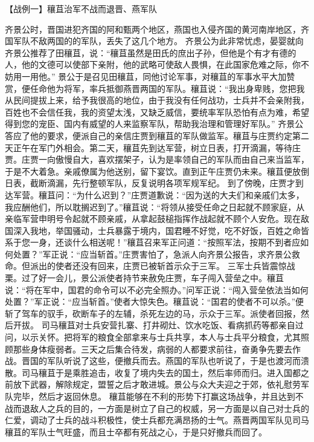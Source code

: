 \documentclass[a4paper,12pt,UTF8,twoside]{ctexbook}
\begin{document}
【战例一】穰苴治军不战而退晋、燕军队

齐景公时，晋国进犯齐国的阿和甄两个地区，燕国也入侵齐国的黄河南岸地区，齐国军队不敌两国的的军队，丢失了这几个地方。
齐景公为此非常忧虑，晏婴就向齐景公推荐了田穰苴，说：“穰苴虽然是田氏的庶出子孙，但他是个有才有德的人，他的文德可以使部下亲附，他的武略可使敌人畏惧，在此国家危难之际，你不妨用一用他。”
景公于是召见田穰苴，同他讨论军事，对穰苴的军事水平大加赞赏，便任命他为将军，率兵抵御燕晋两国的军队。穰苴说：“我出身卑贱，您把我从民间提拔上来，给予我很高的地位，由于我没有任何战功，士兵并不会亲附我，百姓也不会信任我，我的资望太浅，又缺乏威信，要统率军队恐怕有点为难，希望得到您的宠臣、国内有威望的人来监察军队，帮助我治理和管理好军队。”
齐景公答应了他的要求，便派自己的亲信庄贾到穰苴的军队做监军。穰苴与庄贾约定第二天正午在军门外相会。第二天，穰苴先到达军营，树立日表，打开滴漏，等待庄贾。庄贾一向傲慢自大，喜欢摆架子，认为是率领自己的军队而由自己来当监军，于是不大着急。亲戚僚属为他送别，留下宴饮。直到正午庄贾仍未来。穰苴便放倒日表，截断滴漏，先行整顿军队，反复说明各项军规军纪。
到了傍晚，庄贾才到达军营。穰苴问：“为什么迟到？”庄贾道歉说：“因为送的大夫们和亲戚们太多，我应酬他们，所以耽搁迟到了。”穰苴说：“将领从接受任命之日起就不顾家庭，从亲临军营申明号令起就不顾亲戚，从拿起鼓槌指挥作战起就不顾个人安危。现在敌国深入我地，举国骚动，士兵暴露于境内，国君睡不好觉，吃不好饭，百姓之命皆系于您一身，还谈什么相送呢！”穰苴召来军正问道：“按照军法，按期不到者应如何处置？”军正说：“应当斩首。”庄贾害怕了，急派人向齐景公报告，求齐景公救命。但派出的使者还没有回来，庄贾已被斩首示众于三军。
三军士兵皆震惊战栗。过了好一会儿，景公派使者持节来赦免庄贾，车子闯入营垒之中。穰苴说：“将在军中，国君的命令可以不必完全照办。”问军正说：“闯入营垒依法当如何处置？”军正说：“应当斩首。”使者大惊失色。穰苴说：“国君的使者不可以杀。”便斩了驾车的驭手，砍断车子的左辅，杀死左边的马，示众于三军。派使者回报，然后开拔。
司马穰苴对士兵安营扎寨、打井砌灶、饮水吃饭、看病抓药等都亲自过问，以示关怀。把将军的粮食全部拿来与士兵共享，本人与士兵平分粮食，尤其照顾那些身体瘦弱者。三天之后集合待发，病弱的人都要求前往，奋勇争先要去作战。晋国的军队听说了这些，便撤兵而去。燕国的军队也听说了，于是也渡河而溃散。司马穰苴于是乘胜追击，收复了境内失去的国土，然后率师而归。进入国都之前放下武器，解除规定，盟誓之后才敢进城。景公与众大夫迎之于郊，依礼慰劳军队完毕，然后才返回休息。
穰苴能够在不利的形势下打赢这场战争，并且达到不战而退敌人之兵的目的，一方面是树立了自己的权威，另一方面是以自己对士兵的仁爱，调动了士兵的战斗积极性，使士兵都充满昂扬的士气。燕晋两国军队见司马穰苴的军队士气旺盛，而且士卒都有死战之心，于是只好撤兵而回了。
\end{document}
